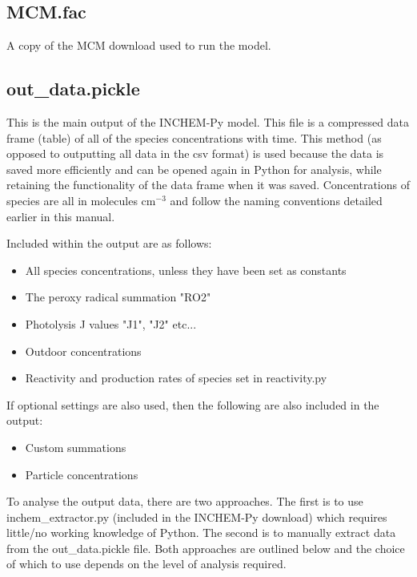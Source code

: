 \documentclass[a4paper]{refart}
\begin{document}
\subsection{MCM.fac}
A copy of the MCM download used to run the model.

\subsection{out\_data.pickle}
This is the main output of the INCHEM-Py model. This file is a compressed data frame (table) of all of the species concentrations with time. This method (as opposed to outputting all data in the csv format) is used because the data is saved more efficiently and can be opened again in Python for analysis, while retaining the functionality of the data frame when it was saved. Concentrations of species are all in molecules cm$^{-3}$ and follow the naming conventions detailed earlier in this manual.

Included within the output are as follows:
\begin{itemize}
    \item All species concentrations, unless they have been set as constants
    \item The peroxy radical summation "RO2"
    \item Photolysis J values "J1", "J2" etc...
    \item Outdoor concentrations
    \item Reactivity and production rates of species set in  reactivity.py 
\end{itemize}
If optional settings are also used, then the following are also included in the output:
\begin{itemize}
    \item Custom summations
    \item Particle concentrations
\end{itemize}

To analyse the output data, there are two approaches. The first is to use inchem\_extractor.py (included in the INCHEM-Py download) which requires little/no working knowledge of Python. The second is to manually extract data from the out\_data.pickle file. Both approaches are outlined below and the choice of which to use depends on the level of analysis required.

\end{document}
